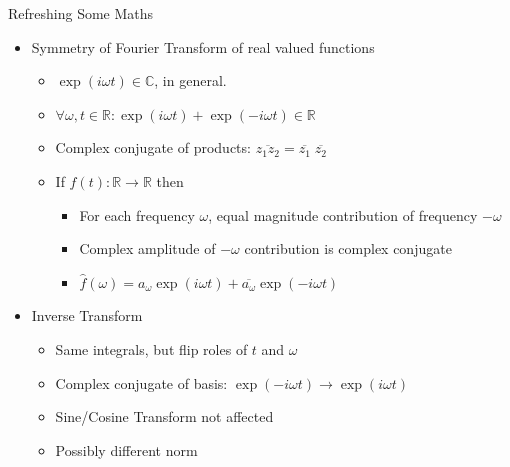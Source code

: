 
\begin{frame}{Refreshing Some Maths}
%
\begin{itemize}
\item Symmetry of Fourier Transform of real valued functions
	\begin{itemize}
	\item $\exp(i\omega t) \in \mathbb{C}$, in general.
	\item $\forall \omega, t \in \mathbb{R}: \exp(i\omega t) + \exp(-i\omega t)\in \mathbb{R}$
	\item Complex conjugate of products: $\overline{z_1 z_2} = \overline{z_1} \; \overline{z_2}$
	\item[\Thus] If $f(t): \mathbb{R} \to \mathbb{R}$ then
		\begin{itemize}
		\item For each frequency $\omega$, equal magnitude contribution of frequency $-\omega$
		\item Complex amplitude of $-\omega$ contribution is complex conjugate
		\item $\hat{f}(\omega) = a_\omega \exp(i\omega t) + \overline{a_\omega} \exp(-i\omega t)$
		\end{itemize}
	\end{itemize}
\item Inverse Transform
	\begin{itemize}
	\item Same integrals, but flip roles of $t$ and $\omega$
	\item Complex conjugate of basis: $\exp(-i\omega t) \to \exp(i\omega t)$
	\item Sine/Cosine Transform not affected
	\item Possibly different norm
	\end{itemize}
\end{itemize}
%
\end{frame}


